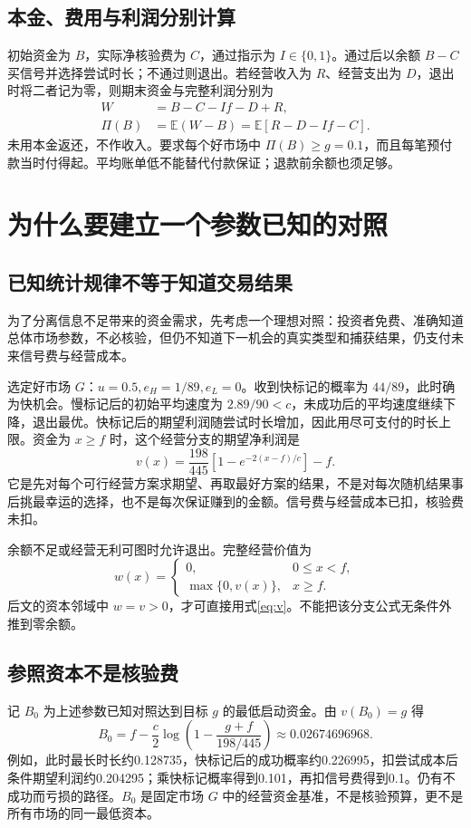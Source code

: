 \documentclass[UTF8,fontset=windows,11pt,a4paper]{ctexart}
\numberwithin{equation}{section}
\begin{document}
\subsection{本金、费用与利润分别计算}
初始资金为 $B$，实际净核验费为 $C$，通过指示为 $I\in\{0,1\}$。通过后以余额 $B-C$ 买信号并选择尝试时长；不通过则退出。若经营收入为 $R$、经营支出为 $D$，退出时将二者记为零，则期末资金与完整利润分别为
\begin{align}
 W&=B-C-If-D+R,\\
 \Pi(B)&=\mathbb E(W-B)=\mathbb E[R-D-If-C].
\end{align}
未用本金返还，不作收入。要求每个好市场中 $\Pi(B)\ge g=0.1$，而且每笔预付款当时付得起。平均账单低不能替代付款保证；退款前余额也须足够。

\section{为什么要建立一个参数已知的对照}
\subsection{已知统计规律不等于知道交易结果}
为了分离信息不足带来的资金需求，先考虑一个理想对照：投资者免费、准确知道总体市场参数，不必核验，但仍不知道下一机会的真实类型和捕获结果，仍支付未来信号费与经营成本。

选定好市场 $G$：$u=0.5,e_H=1/89,e_L=0$。收到快标记的概率为 $44/89$，此时确为快机会。慢标记后的初始平均速度为 $2.89/90<c$，未成功后的平均速度继续下降，退出最优。快标记后的期望利润随尝试时长增加，因此用尽可支付的时长上限。资金为 $x\ge f$ 时，这个经营分支的期望净利润是
\begin{equation}\label{eq:v}
 v(x)=\frac{198}{445}\left[1-e^{-2(x-f)/c}\right]-f.
\end{equation}
它是先对每个可行经营方案求期望、再取最好方案的结果，不是对每次随机结果事后挑最幸运的选择，也不是每次保证赚到的金额。信号费与经营成本已扣，核验费未扣。

余额不足或经营无利可图时允许退出。完整经营价值为
\begin{equation}
 w(x)=\begin{cases}0,&0\le x<f,\\\max\{0,v(x)\},&x\ge f.\end{cases}
\end{equation}
后文的资本邻域中 $w=v>0$，才可直接用式\eqref{eq:v}。不能把该分支公式无条件外推到零余额。

\subsection{参照资本不是核验费}
记 $B_0$ 为上述参数已知对照达到目标 $g$ 的最低启动资金。由 $v(B_0)=g$ 得
\begin{equation}
 B_0=f-\frac c2\log\left(1-\frac{g+f}{198/445}\right)
 \approx0.02674696968.
\end{equation}
例如，此时最长时长约0.128735，快标记后的成功概率约0.226995，扣尝试成本后条件期望利润约0.204295；乘快标记概率得到0.101，再扣信号费得到0.1。仍有不成功而亏损的路径。$B_0$ 是固定市场 $G$ 中的经营资金基准，不是核验预算，更不是所有市场的同一最低资本。
\end{document}
